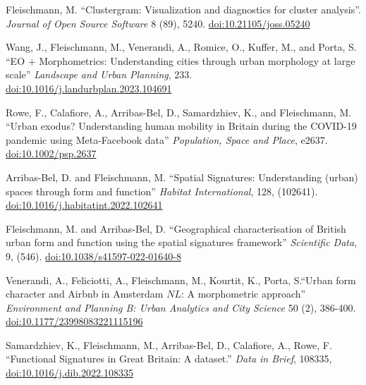\documentclass[12pt,a4paper]{report}
\begin{document}
\begin{tablist}
        \item[2023] \tab{}Fleischmann, M. \enquote{Clustergram: Visualization and diagnostics for cluster analysis}. \textit{Journal of Open Source Software} 8 (89), 5240. \href{https://doi.org/10.21105/joss.05240}{doi:10.21105/joss.05240}

        \item[2023] \tab{}Wang, J., Fleischmann, M., Venerandi, A., Romice, O., Kuffer, M., and Porta, S. \enquote{EO + Morphometrics: Understanding cities through urban morphology at large scale} \textit{Landscape and Urban Planning}, 233. \href{https://doi.org/10.1016/j.landurbplan.2023.104691}{doi:10.1016/j.landurbplan.2023.104691}

        \item[2022] \tab{}Rowe, F., Calafiore, A., Arribas-Bel, D., Samardzhiev, K., and Fleischmann, M. \enquote{Urban exodus? Understanding human mobility in Britain during the COVID-19 pandemic using Meta-Facebook data} \textit{Population, Space and Place}, e2637. \href{https://doi.org/10.1002/psp.2637}{doi:10.1002/psp.2637}

        \item[2022] \tab{}Arribas-Bel, D. and Fleischmann, M. \enquote{Spatial Signatures: Understanding (urban) spaces through form and function} \textit{Habitat International}, 128, (102641). \href{https://doi.org/10.1016/j.habitatint.2022.102641}{doi:10.1016/j.habitatint.2022.102641}

        \item[2022] \tab{}Fleischmann, M. and Arribas-Bel, D. \enquote{Geographical characterisation of British urban form and function using the spatial signatures framework} \textit{Scientific Data}, 9, (546). \href{https://doi.org/10.1038/s41597-022-01640-8}{doi:10.1038/s41597-022-01640-8}

        \item[2022] \tab{}Venerandi, A., Feliciotti, A., Fleischmann, M., Kourtit, K., Porta, S.\enquote{Urban form character and Airbnb in Amsterdam \(NL\): A morphometric approach} \textit{Environment and Planning B: Urban Analytics and City Science} 50 (2), 386-400. \href{https://doi.org/10.1177/23998083221115196}{doi:10.1177/23998083221115196}

        \item[2022] \tab{}Samardzhiev, K., Fleischmann, M., Arribas-Bel, D., Calafiore, A., Rowe, F. \enquote{Functional Signatures in Great Britain: A dataset.} \textit{Data in Brief}, 108335, \href{https://doi.org/10.1016/j.dib.2022.108335}{doi:10.1016/j.dib.2022.108335}


\end{tablist}
\end{document}
